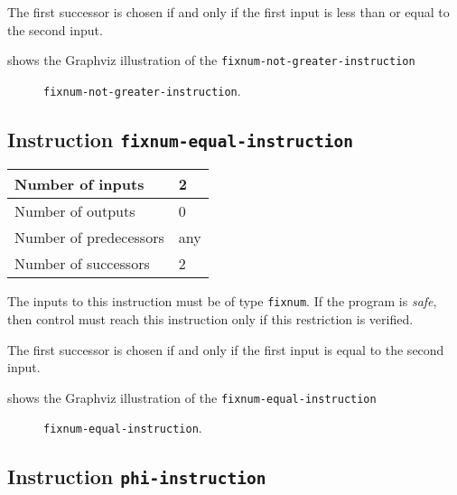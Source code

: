 The first successor is chosen if and only if the first input is
less than or equal to the second input.

 shows the Graphviz illustration of the
\texttt{fixnum-not-greater-instruction}

\begin{figure}
\begin{center}
\end{center}
\caption{\label{fig-fixnum-le-instruction}
\texttt{fixnum-not-greater-instruction}.}
\end{figure}

\subsection{Instruction \texttt{fixnum-equal-instruction}}
\label{mir-instruction-fixnum-equal}

\begin{tabular}{|l|l|}
\hline
Number of inputs & 2\\
\hline
Number of outputs & 0\\
\hline
Number of predecessors & any\\
\hline
Number of successors & 2\\
\hline
\end{tabular}

The inputs to this instruction must be of type \texttt{fixnum}.  If
the program is \emph{safe}, then control must reach this instruction
only if this restriction is verified.

The first successor is chosen if and only if the first input is equal
to the second input.

 shows the Graphviz illustration of the
\texttt{fixnum-equal-instruction}

\begin{figure}
\begin{center}
\end{center}
\caption{\label{fig-fixnum-equal-instruction}
\texttt{fixnum-equal-instruction}.}
\end{figure}

\subsection{Instruction \texttt{phi-instruction}}
\label{mir-instruction-phi}

